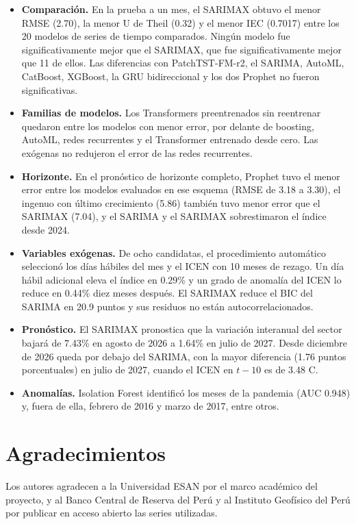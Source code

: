 \documentclass[conference]{IEEEtran}
\begin{document}
\begin{itemize}[leftmargin=1.3em,itemsep=2pt]
  \item \textbf{Comparación.} En la prueba a un mes, el SARIMAX obtuvo el menor RMSE (2.70), la menor U de Theil (0.32) y el menor IEC (0.7017) entre los 20 modelos de series de tiempo comparados. Ningún modelo fue significativamente mejor que el SARIMAX, que fue significativamente mejor que 11 de ellos. Las diferencias con PatchTST-FM-r2, el SARIMA, AutoML, CatBoost, XGBoost, la GRU bidireccional y los dos Prophet no fueron significativas.
  \item \textbf{Familias de modelos.} Los Transformers preentrenados sin reentrenar quedaron entre los modelos con menor error, por delante de boosting, AutoML, redes recurrentes y el Transformer entrenado desde cero. Las exógenas no redujeron el error de las redes recurrentes.
  \item \textbf{Horizonte.} En el pronóstico de horizonte completo, Prophet tuvo el menor error entre los modelos evaluados en ese esquema (RMSE de 3.18 a 3.30), el ingenuo con último crecimiento (5.86) también tuvo menor error que el SARIMAX (7.04), y el SARIMA y el SARIMAX sobrestimaron el índice desde 2024.
  \item \textbf{Variables exógenas.} De ocho candidatas, el procedimiento automático seleccionó los días hábiles del mes y el ICEN con 10 meses de rezago. Un día hábil adicional eleva el índice en 0.29\% y un grado de anomalía del ICEN lo reduce en 0.44\% diez meses después. El SARIMAX reduce el BIC del SARIMA en 20.9 puntos y sus residuos no están autocorrelacionados.
  \item \textbf{Pronóstico.} El SARIMAX pronostica que la variación interanual del sector bajará de 7.43\% en agosto de 2026 a 1.64\% en julio de 2027. Desde diciembre de 2026 queda por debajo del SARIMA, con la mayor diferencia (1.76 puntos porcentuales) en julio de 2027, cuando el ICEN en $t-10$ es de 3.48 \textdegree C.
  \item \textbf{Anomalías.} Isolation Forest identificó los meses de la pandemia (AUC 0.948) y, fuera de ella, febrero de 2016 y marzo de 2017, entre otros.
\end{itemize}

\section*{Agradecimientos}

Los autores agradecen a la Universidad ESAN por el marco académico del proyecto, y al Banco Central de Reserva del Perú y al Instituto Geofísico del Perú por publicar en acceso abierto las series utilizadas.
\end{document}
